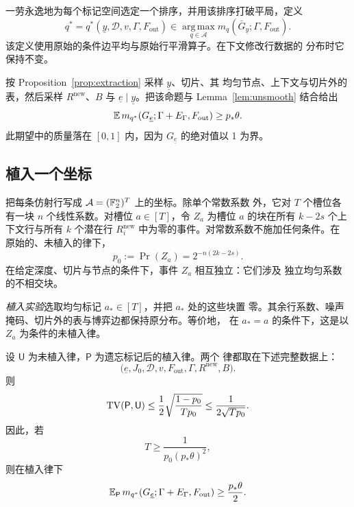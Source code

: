 一劳永逸地为每个标记空间选定一个排序，并用该排序打破平局，定义
\begin{equation}\label{eq:decoder-choice}
 q^*=q^*(\underline y,\mathcal D,v,\Gamma,F_{\mathrm{out}})
 \in\operatorname*{arg\,max}_{q\in\mathcal A}
 m_q(\bar G_{\underline y};\Gamma,F_{\mathrm{out}}).
\end{equation}
该定义使用原始的条件边平均与原始行平滑算子。在下文修改行数据的
分布时它保持不变。

按 Proposition~\ref{prop:extraction} 采样 $\underline y$、切片、其
均匀节点、上下文与切片外的表，然后采样 $R^{\mathrm{new}}$、$B$ 与
$\underline e\mid\underline y$。把该命题与 Lemma~\ref{lem:unsmooth}
结合给出
\begin{equation}\label{eq:unplanted-score}
 \mathbb E\,m_{q^*}(G_{\underline e};
              \Gamma+E_\Gamma,F_{\mathrm{out}})
 \geq p_*\theta.
\end{equation}
此期望中的质量落在 $[0,1]$ 内，因为 $G_{\underline e}$ 的绝对值以
1 为界。

\subsection{植入一个坐标}

把每条仿射行写成 $\mathcal A=(\mathbb F_2^n)^T$ 上的坐标。除单个常数系数
外，它对 $T$ 个槽位各有一块 $n$ 个线性系数。对槽位 $a\in[T]$，令
$Z_a$ 为槽位 $a$ 的块在所有 $k-2s$ 个上下文行与所有 $k$ 个潜在行
$R^{\mathrm{new}}_i$ 中为零的事件。对常数系数不施加任何条件。在
原始的、未植入的律下，
\begin{equation}\label{eq:zero-slot-probability}
 p_0:=\Pr(Z_a)=2^{-n(2k-2s)}.
\end{equation}
在给定深度、切片与节点的条件下，事件 $Z_a$ 相互独立：它们涉及
独立均匀系数的不相交块。

\emph{植入实验}选取均匀标记 $a_*\in[T]$，并把 $a_*$ 处的这些块置
零。其余行系数、噪声掩码、切片外的表与博弈边都保持原分布。等价地，
在 $a_*=a$ 的条件下，这是以 $Z_a$ 为条件的未植入律。

\begin{lemma}[隐藏被植入的坐标]\label{lem:planting}
设 $\mathsf U$ 为未植入律，$\mathsf P$ 为遗忘标记后的植入律。两个
律都取在下述完整数据上：
\[
 \bigl(\underline e,J_0,\mathcal D,v,F_{\mathrm{out}},
        \Gamma,R^{\mathrm{new}},B\bigr).
\]
则
\begin{equation}\label{eq:planting-tv}
 \operatorname{TV}(\mathsf P,\mathsf U)
 \leq \frac12\sqrt{\frac{1-p_0}{Tp_0}}
 \leq \frac{1}{2\sqrt{Tp_0}}.
\end{equation}
因此，若
\begin{equation}\label{eq:decoder-repetition}
 T\geq\frac{1}{p_0(p_*\theta)^2},
\end{equation}
则在植入律下
\begin{equation}\label{eq:planted-score}
 \mathbb E_{\mathsf P}\,m_{q^*}(G_{\underline e};
               \Gamma+E_\Gamma,F_{\mathrm{out}})
 \geq \frac{p_*\theta}{2}.
\end{equation}
\end{lemma}

